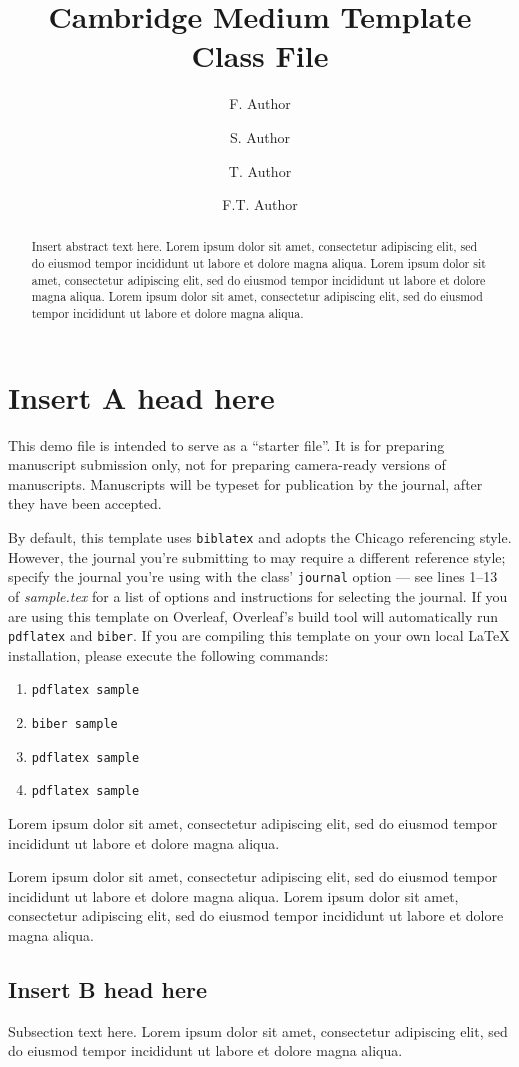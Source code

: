\documentclass[
  journal=medium,
  manuscript=article-type,
  year=2020,
  volume=37,
]{cup-journal}
\title{Cambridge Medium Template Class File}
\author{F. Author}
\affiliation{First Division, Organization, City, Pincode, State, Country}
\author{S. Author}
\affiliation{Second Division, Organization, City, Pincode, State, Country}
\author{T. Author}
\affiliation{Second Division, Organization, City, Pincode, State, Country}
\author{F.T. Author}
\affiliation{Fourth Division, Organization, City, Pincode, State, Country}
\begin{document}
\begin{abstract}
Insert abstract text here. Lorem ipsum dolor sit amet, consectetur adipiscing elit, sed do eiusmod tempor incididunt ut labore et dolore magna aliqua. Lorem ipsum dolor sit amet, consectetur adipiscing elit, sed do eiusmod tempor incididunt ut labore et dolore magna aliqua. Lorem ipsum dolor sit amet, consectetur adipiscing elit, sed do eiusmod tempor incididunt ut labore et dolore magna aliqua. 
\end{abstract}

\section{Insert A head here}
This demo file is intended to serve as a ``starter file''. It is for preparing manuscript submission only, not for preparing camera-ready versions of manuscripts. Manuscripts will be typeset for publication by the journal, after they have been accepted.

By default, this template uses \texttt{biblatex} and adopts the Chicago referencing style. However, the journal you’re submitting to may require a different reference style; specify the journal you're using with the class' \texttt{journal} option --- see lines 1--13 of \emph{sample.tex} for a list of options and instructions for selecting the journal. If you are using this template on Overleaf, Overleaf's build tool will automatically run \texttt{pdflatex} and \texttt{biber}. If you are compiling this template on your own local \LaTeX{} installation, please execute the following commands:
\begin{enumerate}
    \item \verb|pdflatex sample|
    \item \verb|biber sample|
    \item \verb|pdflatex sample|
    \item \verb|pdflatex sample|
\end{enumerate}

Lorem ipsum dolor sit amet, consectetur adipiscing elit, sed do eiusmod tempor incididunt ut labore et dolore magna aliqua. 

Lorem ipsum dolor sit amet, consectetur adipiscing elit, sed do eiusmod tempor incididunt ut labore et dolore magna aliqua. Lorem ipsum dolor sit amet, consectetur adipiscing elit, sed do eiusmod tempor incididunt ut labore et dolore magna aliqua. 


\subsection{Insert B head here}
Subsection text here. Lorem ipsum\autocite{Bayer_etal_2013} dolor sit amet, consectetur adipiscing elit, sed do eiusmod tempor incididunt ut labore\autocite{Adade_etal_2007} et dolore magna aliqua. 
\end{document}
